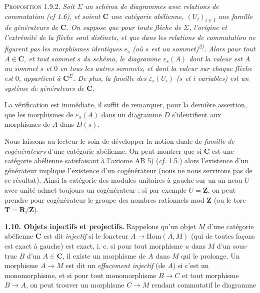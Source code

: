 
\textsc{Proposition 1.9.2.} \textit{Soit $\Sigma$ un schéma de
diagrammes avec relations de commutation \textup{(}\textit{cf} \textup{1.6)}, et soient $\mathbf{C}$ une
catégorie abélienne, $(U_i)_{i\in I}$ une famille de générateurs de $\mathbf{C}$. On
suppose que pour toute flèche de $\Sigma$, l'origine et l'extrémité de la
flèche sont distincts, et que dans les relations de commutation ne figurent
pas les morphismes identiques $e_s$ (où $s$ est un sommet)\textsuperscript{2)}.
Alors pour tout $A\in \mathbf{C}$, et tout sommet $s$ du schéma, le diagramme
$\varepsilon_s(A)$ dont la valeur est $A$ au sommet $s$ et $0$ en tous les
autres sommets, et dont la valeur sur chaque flèche est $0$, appartient à
$\mathbf{C}^\Sigma$. De plus, la famille des $\varepsilon_s(U_i)$ ($s$ et $i$
variables) est un système de générateurs de $\mathbf{C}$.}

La vérification est immédiate, il suffit de remarquer, pour la dernière
assertion, que les morphismes de $\varepsilon_s(A)$ dans un diagramme $D$
s'identifient aux morphismes de $A$ dans $D(s)$.

Nous laissons au lecteur le soin de développer la notion duale de
\textit{famille de cogénérateurs} d'une catégorie abélienne. On peut montrer
que si $\mathbf{C}$ est une catégorie abélienne satisfaisant à l'axiome AB 5)
(\textit{cf.} 1.5.) alors l'existence d'un générateur implique l'existence d'un
cogénérateur (nous ne nous servirons pas de ce résultat). Ainsi la catégorie
des modules unitaires à gauche sur un an neau $U$ avec unité admet toujours un
cogénérateur : si par exemple $U=\mathbf Z$, on peut prendre pour cogénérateur
le groupe des nombres rationnels mod $\mathbf Z$ (ou le tore
$\mathbf T=\mathbf R/\mathbf Z$).

\textbf{1.10. Objets injectifs et projectifs.}
Rappelons qu'un objet $M$ d'une catégorie abélienne $\mathbf{C}$ est dit
\textit{injectif} si le foncteur $A\to\mathrm{Hom}(A,M)$ (qui de toutes
façons est exact à gauche) est exact, i. e. si pour tout morphisme $u$ dans
$M$ d'un sous-truc $B$ d'un $A\in \mathbf{C}$, il existe un morphisme de $A$ dans $M$
qui le prolonge.
Un morphisme $A\to M$ est dit un \textit{effacement injectif} (de
$A$) si c'est un monomorphisme, et si pour tout monomorphisme
$B\to C$ et tout morphisme $B\to A$, on peut trouver
un morphisme $C\to M$ rendant commutatif le diagramme

